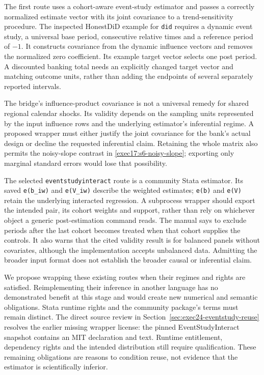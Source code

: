 The first route uses a cohort-aware event-study estimator and passes
a correctly normalized estimate vector with its joint covariance to
a trend-sensitivity procedure. The inspected HonestDiD example for
\texttt{did} requires a dynamic event study, a universal base period,
consecutive relative times and a reference period of $-1$. It
constructs covariance from the dynamic influence vectors and removes
the normalized zero coefficient. Its example target vector selects
one post period. A discounted banking total needs an explicitly
changed target vector and matching outcome units, rather than adding
the endpoints of several separately reported intervals.
\citep{sw_honestdid,exec17_s6_paths}

The bridge's influence-product covariance is not a universal remedy
for shared regional calendar shocks. Its validity depends on the
sampling units represented by the input influence rows and the
underlying estimator's inferential regime. A proposed wrapper must
either justify the joint covariance for the bank's actual design or
decline the requested inferential claim. Retaining the whole matrix
also permits the noisy-slope contrast in
\eqref{exec17:s6-noisy-slope}; exporting only marginal standard
errors would lose that possibility.

The selected \texttt{eventstudyinteract} route is a community Stata
estimator. Its saved \texttt{e(b\_iw)} and \texttt{e(V\_iw)} describe
the weighted estimates; \texttt{e(b)} and \texttt{e(V)} retain the
underlying interacted regression. A subprocess wrapper should export
the intended pair, its cohort weights and support, rather than rely
on whichever object a generic post-estimation command reads. The
manual says to exclude periods after the last cohort becomes treated
when that cohort supplies the controls. It also warns that the cited
validity result is for balanced panels without covariates, although
the implementation accepts unbalanced data. Admitting the broader
input format does not establish the broader causal or inferential
claim.~\citep{v12_sw_eventstudyinteract}

We propose wrapping these existing routes when their regimes and
rights are satisfied. Reimplementing their inference in another
language has no demonstrated benefit at this stage and would create
new numerical and semantic obligations. Stata runtime rights and the
community package's terms must remain distinct. The direct source review in
Section~\ref{sec:exec24-eventstudy-reuse} resolves the earlier missing wrapper
license: the pinned EventStudyInteract snapshot contains an MIT declaration
and text. Runtime entitlement, dependency rights and the intended distribution
still require qualification. These remaining obligations are reasons to
condition reuse, not evidence that the estimator is scientifically inferior.

